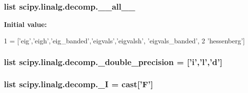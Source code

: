 \subsubsection[{\+\_\+\+\_\+all\+\_\+\+\_\+}]{\setlength{\rightskip}{0pt plus 5cm}list scipy.\+linalg.\+decomp.\+\_\+\+\_\+all\+\_\+\+\_\+}\label{namespacescipy_1_1linalg_1_1decomp_aed4bc8f65864af8dae58416aef1dec7e}
{\bfseries Initial value\+:}
\begin{DoxyCode}
1 = [\textcolor{stringliteral}{'eig'},\textcolor{stringliteral}{'eigh'},\textcolor{stringliteral}{'eig\_banded'},\textcolor{stringliteral}{'eigvals'},\textcolor{stringliteral}{'eigvalsh'}, \textcolor{stringliteral}{'eigvals\_banded'},
2            \textcolor{stringliteral}{'hessenberg'}]
\end{DoxyCode}
\hypertarget{namespacescipy_1_1linalg_1_1decomp_a7db1b5614c050a812a097fb7abf39064}{}
\subsubsection[{\+\_\+double\+\_\+precision}]{\setlength{\rightskip}{0pt plus 5cm}list scipy.\+linalg.\+decomp.\+\_\+double\+\_\+precision = \mbox{[}'{\bf i}','{\bf l}','d'\mbox{]}}\label{namespacescipy_1_1linalg_1_1decomp_a7db1b5614c050a812a097fb7abf39064}
\hypertarget{namespacescipy_1_1linalg_1_1decomp_a876dcd3eb7c70eeae0fa8ca049073d25}{}
\subsubsection[{\+\_\+\+I}]{\setlength{\rightskip}{0pt plus 5cm}list scipy.\+linalg.\+decomp.\+\_\+\+I = {\bf cast}\mbox{[}'F'\mbox{]}}\label{namespacescipy_1_1linalg_1_1decomp_a876dcd3eb7c70eeae0fa8ca049073d25}
